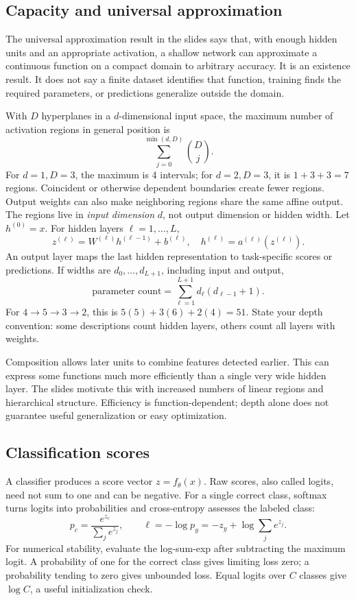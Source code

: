 \documentclass[11pt]{article}
\begin{document}
\subsection{Capacity and universal approximation}
The universal approximation result in the slides says that, with enough hidden units and an appropriate activation, a shallow network can approximate a continuous function on a compact domain to arbitrary accuracy. It is an existence result. It does not say a finite dataset identifies that function, training finds the required parameters, or predictions generalize outside the domain.

With $D$ hyperplanes in a $d$-dimensional input space, the maximum number of activation regions in general position is
\[
\sum_{j=0}^{\min(d,D)}\binom{D}{j}.
\]
For $d=1,D=3$, the maximum is 4 intervals; for $d=2,D=3$, it is $1+3+3=7$ regions. Coincident or otherwise dependent boundaries create fewer regions. Output weights can also make neighboring regions share the same affine output. The regions live in \emph{input dimension} $d$, not output dimension or hidden width.
Let $h^{(0)}=x$. For hidden layers $\ell=1,\ldots,L$,
\[
z^{(\ell)}=W^{(\ell)}h^{(\ell-1)}+b^{(\ell)},\quad
h^{(\ell)}=a^{(\ell)}(z^{(\ell)}).
\]
An output layer maps the last hidden representation to task-specific scores or predictions. If widths are $d_0,\ldots,d_{L+1}$, including input and output,
\[
\text{parameter count}=\sum_{\ell=1}^{L+1}d_\ell(d_{\ell-1}+1).
\]
For $4\to5\to3\to2$, this is $5(5)+3(6)+2(4)=51$. State your depth convention: some descriptions count hidden layers, others count all layers with weights.

Composition allows later units to combine features detected earlier. This can express some functions much more efficiently than a single very wide hidden layer. The slides motivate this with increased numbers of linear regions and hierarchical structure. Efficiency is function-dependent; depth alone does not guarantee useful generalization or easy optimization.
\subsection{Classification scores}
A classifier produces a score vector $z=f_\theta(x)$. Raw scores, also called logits, need not sum to one and can be negative. For a single correct class, softmax turns logits into probabilities and cross-entropy assesses the labeled class:
\[
p_c=\frac{e^{z_c}}{\sum_je^{z_j}},\qquad
\ell=-\log p_y=-z_y+\log\sum_je^{z_j}.
\]
For numerical stability, evaluate the log-sum-exp after subtracting the maximum logit. A probability of one for the correct class gives limiting loss zero; a probability tending to zero gives unbounded loss. Equal logits over $C$ classes give $\log C$, a useful initialization check.
\end{document}
